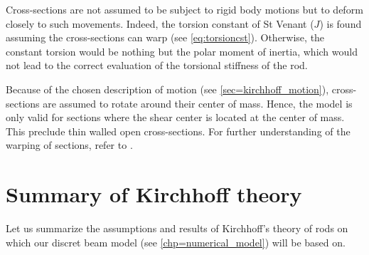 Cross-sections are not assumed to be subject to rigid body motions but to deform closely to such movements. Indeed, the torsion constant of St Venant ($J$) is found assuming the cross-sections can warp (see \cref{eq:torsioncst}). Otherwise, the constant torsion would be nothing but the polar moment of inertia, which would not lead to the correct evaluation of the torsional stiffness of the rod.

Because of the chosen description of motion (see \cref{sec=kirchhoff_motion}), cross-sections are assumed to rotate around their center of mass. Hence, the model is only valid for sections where the shear center is located at the center of mass. This preclude thin walled open cross-sections. For further understanding of the warping of sections, refer to \cite{Alves2014}.


%
%

%

\clearpage
\section{Summary of Kirchhoff theory}\label{sec=ksummary}
Let us summarize the assumptions and results of Kirchhoff's theory of rods on which our discret beam model (see \cref{chp=numerical_model}) will be based on.

